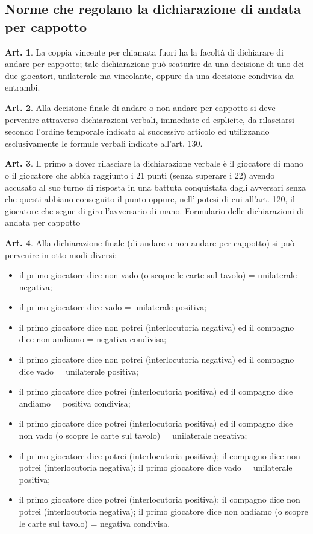 \documentclass[italian,a4paper]{article}
\theoremstyle{definition}
\newtheorem{art}{Art.}
\begin{document}
\subsection{Norme che regolano la dichiarazione di andata per cappotto}
\begin{art}
La coppia vincente per chiamata fuori ha la facoltà di dichiarare di andare per cappotto; tale dichiarazione può scaturire da una decisione di uno dei due giocatori, unilaterale ma vincolante, oppure da una decisione condivisa da entrambi.
\end{art}
\begin{art}
Alla decisione finale di andare o non andare per cappotto si deve pervenire attraverso dichiarazioni verbali, immediate ed esplicite, da rilasciarsi secondo l'ordine temporale indicato al successivo articolo ed utilizzando esclusivamente le formule verbali indicate all'art. 130. 
\end{art}
\begin{art}
Il primo a dover rilasciare la dichiarazione verbale è il giocatore di mano o il giocatore che abbia raggiunto i 21 punti (senza superare i 22) avendo accusato al suo turno di risposta in una battuta conquistata dagli avversari senza che questi abbiano conseguito il punto oppure, nell'ipotesi di cui all'art. 120, il giocatore che segue di giro l'avversario di mano.
Formulario delle dichiarazioni di andata per cappotto
\end{art}
\begin{art}
Alla dichiarazione finale (di andare o non andare per cappotto) si può pervenire in otto modi diversi:
\begin{itemize}
\item    il primo giocatore dice non vado (o scopre le carte sul tavolo) = unilaterale negativa;
\item    il primo giocatore dice vado = unilaterale positiva;
\item    il primo giocatore dice non potrei (interlocutoria negativa) ed il compagno dice non andiamo  = negativa condivisa;
\item    il primo giocatore dice non potrei  (interlocutoria negativa) ed il compagno dice vado = unilaterale positiva;
\item    il primo giocatore dice potrei (interlocutoria positiva) ed il compagno dice andiamo = positiva condivisa;
\item    il primo giocatore dice potrei (interlocutoria positiva) ed il compagno dice non vado (o scopre le carte sul tavolo) = unilaterale negativa;
\item    il primo giocatore dice potrei (interlocutoria positiva); il compagno dice non potrei  (interlocutoria negativa); il primo giocatore dice vado = unilaterale positiva;
\item    il primo giocatore dice potrei (interlocutoria positiva); il compagno dice non potrei  (interlocutoria negativa); il primo giocatore dice non andiamo (o scopre le carte sul tavolo) = negativa condivisa.
    \end{itemize}
\end{art}
\end{document}
